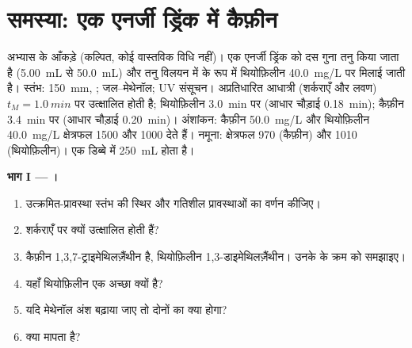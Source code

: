 \section{समस्या: एक एनर्जी ड्रिंक में कैफ़ीन}

\begin{problem}
\label{pb:b2:chromatography:1}
अभ्यास के आँकड़े (कल्पित, कोई वास्तविक विधि नहीं)। एक एनर्जी ड्रिंक को दस गुना तनु किया जाता है (\qty{5.00}{mL} से
\qty{50.0}{mL}) और तनु विलयन में  के रूप में थियोफ़िलीन \qty{40.0}{mg/L} पर मिलाई जाती है।
स्तंभ: \qty{150}{mm}, ;  जल--मेथेनॉल; UV संसूचन।
अप्रतिधारित आधात्री (शर्कराएँ और लवण) $t_M = \qty{1.0}{min}$ पर उत्क्षालित होती है; थियोफ़िलीन
\qty{3.0}{min} पर (आधार चौड़ाई \qty{0.18}{min}); कैफ़ीन \qty{3.4}{min} पर (आधार चौड़ाई \qty{0.20}{min})।
अंशांकन: कैफ़ीन \qty{50.0}{mg/L} और थियोफ़िलीन \qty{40.0}{mg/L} क्षेत्रफल 1500 और 1000 देते हैं।
नमूना: क्षेत्रफल 970 (कैफ़ीन) और 1010 (थियोफ़िलीन)। एक डिब्बे में \qty{250}{mL} होता है।

\begin{center}
\end{center}

\medskip
\noindent\textbf{भाग I --- ।}
\begin{enumerate}
  \item उत्क्रमित-प्रावस्था स्तंभ की स्थिर और गतिशील प्रावस्थाओं का वर्णन कीजिए।
  \item शर्कराएँ  पर क्यों उत्क्षालित होती हैं?
  \item कैफ़ीन 1,3,7-ट्राइमेथिलज़ैंथीन है, थियोफ़िलीन 1,3-डाइमेथिलज़ैंथीन। उनके  के
        क्रम को समझाइए।
  \item यहाँ थियोफ़िलीन एक अच्छा  क्यों है?
  \item यदि मेथेनॉल अंश बढ़ाया जाए तो दोनों  का क्या होगा?
  \item {} क्या मापता है?
\end{enumerate}


\end{problem}

